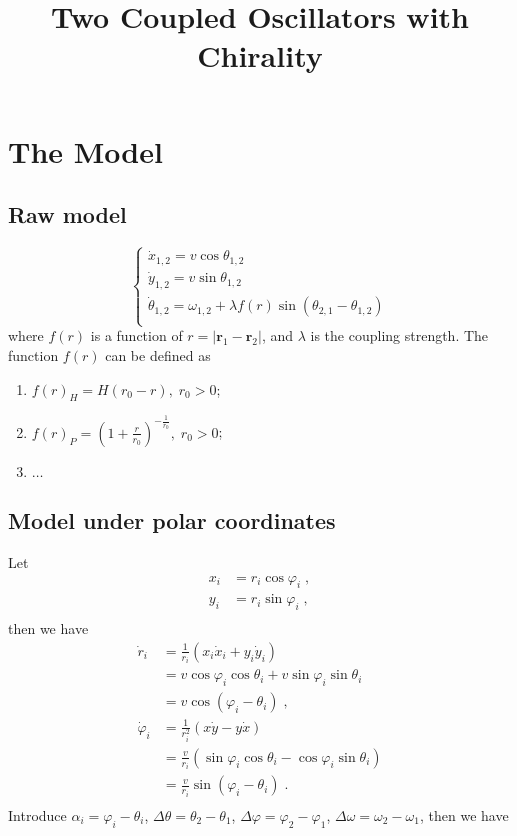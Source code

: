 \documentclass{article}
\title{\textbf{Two Coupled Oscillators with Chirality}}
\begin{document}
\maketitle

\section{The Model}

\subsection{Raw model}

$$
\begin{cases}
	\dot{x}_{1,2}=v\cos \theta _{1,2}\\
	\dot{y}_{1,2}=v\sin \theta _{1,2}\\
	\dot{\theta}_{1,2}=\omega _{1,2}+\lambda f\left( r \right) \sin \left( \theta _{2,1}-\theta _{1,2} \right)\\
\end{cases}
$$
where $f\left( r \right)$ is a function of $r=\left| \mathbf{r}_1-\mathbf{r}_2 \right|$, and $\lambda$ is the coupling strength. The function $f\left( r \right)$ can be defined as

\begin{enumerate}
    \item $f\left( r \right) _H=H\left( r_0-r \right),\;r_0>0$;
    \item $f\left( r \right) _P=\left( 1+\frac{r}{r_0} \right) ^{-\frac{1}{r_0}},\;r_0>0$;
    \item $\dots$
\end{enumerate}

\subsection{Model under polar coordinates}

Let
$$
\begin{aligned}
	x_i&=r_i\cos \varphi _i\;,\\
	y_i&=r_i\sin \varphi _i\;,\\
\end{aligned}
$$
then we have
$$
\begin{aligned}
	\dot{r}_i&=\frac{1}{r_i}\left( x_i\dot{x}_i+y_i\dot{y}_i \right)\\
	&=v\cos \varphi _i\cos \theta _i+v\sin \varphi _i\sin \theta _i\\
	&=v\cos \left( \varphi _i-\theta _i \right)\;,\\
	\dot{\varphi}_i&=\frac{1}{r_{i}^{2}}\left( x\dot{y}-y\dot{x} \right)\\
	&=\frac{v}{r_i}\left( \sin \varphi _i\cos \theta _i-\cos \varphi _i\sin \theta _i \right)\\
	&=\frac{v}{r_i}\sin \left( \varphi _i-\theta _i \right)\;.\\
\end{aligned}
$$
Introduce $\alpha_i=\varphi_i-\theta_i$, $\Delta \theta =\theta _2-\theta _1$, $\Delta \varphi =\varphi _2-\varphi _1$, $\Delta \omega =\omega _2-\omega _1$, then we have
\end{document}
